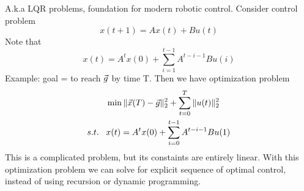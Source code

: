 \begin{definition}
	A.k.a LQR problems, foundation for modern robotic control. Consider control problem
	\[
x(t+1) = Ax(t)+Bu(t)
	\]
	Note that
	\[
x(t) = A^tx(0)+\sum_{i=1}^{t-1}A^{t-i-1}Bu(i)
	\]
	Example: goal = to reach $\vec{g}$ by time T. Then we have optimization problem
	\begin{align*}
		&\min \|\vec{x}(T)-\vec{g}\|_2^2+\sum_{t=0}^T\|u(t)\|_2^2\\
s.t.\;\;\;&x(t) = A^tx(0)+\sum_{i=0}^{t-1}A^{t-i-1}Bu(1)
	\end{align*}
	This is a complicated problem, but its constaints are entirely linear. With this optimization problem we can solve for explicit sequence of optimal control, instead of using recursion or dynamic programming.
\end{definition}


